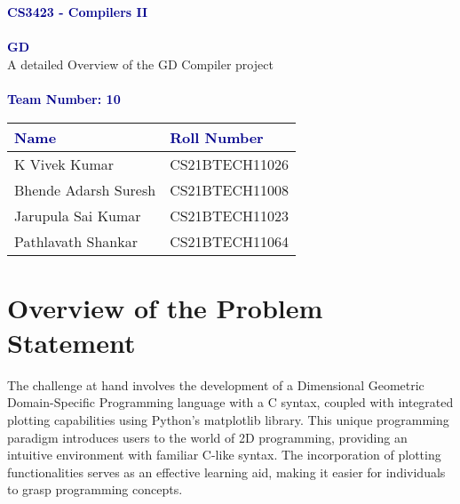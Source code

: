 \documentclass{article}
\begin{document}
\begin{titlepage}
    \thispagestyle{empty}
    \begin{center}
        \vspace*{1cm}
        \Large \textcolor{darkblue}{\textbf{CS3423 - Compilers II}}\\
        \hrulefill\\
        \vspace{2cm}
        \Huge \textcolor{darkblue}{\textbf{GD}}\\
        \vspace{0.5cm}
        \normalsize A detailed Overview of the GD Compiler project\\
        \vspace{2cm}
        \large \textcolor{darkblue}{\textbf{}}\\
        \vspace{0.5cm}
        \large \textcolor{darkblue}{\textbf{Team Number: 10}}\\
        \vspace{1.5cm}
        \begin{tabular}{l l}
            \toprule
            \textcolor{darkblue}{\textbf{Name}} & \textcolor{darkblue}{\textbf{Roll Number}} \\
            \midrule
            K Vivek Kumar & CS21BTECH11026 \\
            Bhende Adarsh Suresh & CS21BTECH11008 \\
            Jarupula Sai Kumar & CS21BTECH11023 \\
            Pathlavath Shankar & CS21BTECH11064 \\
            \bottomrule
        \end{tabular}
    \end{center}
\end{titlepage}

\tableofcontents
\section{Overview of the Problem Statement}
The challenge at hand involves the development of a Dimensional Geometric Domain-Specific Programming language with a C syntax, coupled with integrated plotting capabilities using Python's matplotlib library. This unique programming paradigm introduces users to the world of 2D programming, providing an intuitive environment with familiar C-like syntax. The incorporation of plotting functionalities serves as an effective learning aid, making it easier for individuals to grasp programming concepts.
\end{document}
